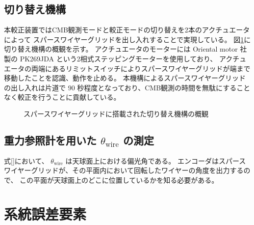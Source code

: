 \documentclass[../../main.tex]{subfiles}
\begin{document}
\subsection{切り替え機構}
本較正装置ではCMB観測モードと較正モードの切り替えを2本のアクチュエータによって
スパースワイヤーグリッドを出し入れすることで実現している。
図\ref{}に切り替え機構の概観を示す。
アクチュエータのモーターには Oriental motor 社製の PK269JDA という2相式ステッピングモーターを使用しており、
アクチュエータの両端にあるリミットスイッチによりスパースワイヤーグリッドが端まで移動したことを認識、動作を止める。
本機構によるスパースワイヤーグリッドの出し入れは片道で $90$ 秒程度となっており、CMB観測の時間を無駄にすることなく較正を行うことに貢献している\cite{swg:nakata}。
\begin{figure}
    \centering
    \caption[スパースワイヤーグリッドに搭載された切り替え機構の概観]{スパースワイヤーグリッドに搭載された切り替え機構の概観}
    \label{fig:gridloader}
\end{figure}
\subsection{重力参照計を用いた $\theta_{\mathrm{wire}}$ の測定}
式\eqref{}において、 $\theta_{\mathrm{wire}}$ は天球面上における偏光角である。
エンコーダはスパースワイヤーグリッドが、その平面内において回転したワイヤーの角度を出力するので、
この平面が天球面上のどこに位置しているかを知る必要がある。



\section{系統誤差要素}
\end{document}
